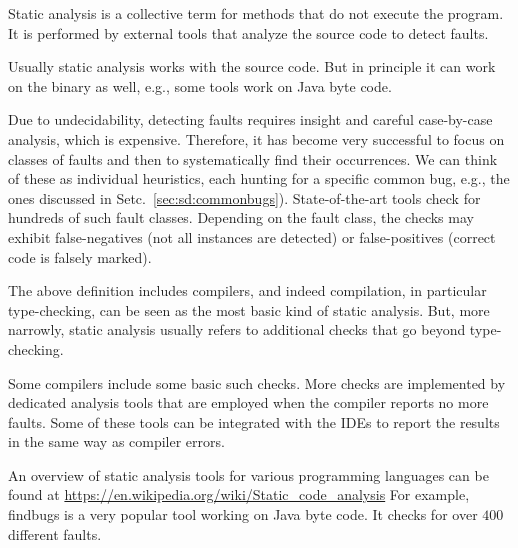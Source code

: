 Static analysis is a collective term for methods that do not execute the program.
It is performed by external tools that analyze the source code to detect faults.

Usually static analysis works with the source code.
But in principle it can work on the binary as well, e.g., some tools work on Java byte code.

Due to undecidability, detecting faults requires insight and careful case-by-case analysis, which is expensive.
Therefore, it has become very successful to focus on classes of faults and then to systematically find their occurrences.
We can think of these as individual heuristics, each hunting for a specific common bug, e.g., the ones discussed in Setc.~\ref{sec:sd:commonbugs}).
State-of-the-art tools check for hundreds of such fault classes.
Depending on the fault class, the checks may exhibit false-negatives (not all instances are detected) or false-positives (correct code is falsely marked).

The above definition includes compilers, and indeed compilation, in particular type-checking, can be seen as the most basic kind of static analysis.
But, more narrowly, static analysis usually refers to additional checks that go beyond type-checking.

Some compilers include some basic such checks.
More checks are implemented by dedicated analysis tools that are employed when the compiler reports no more faults.
Some of these tools can be integrated with the IDEs to report the results in the same way as compiler errors.

An overview of static analysis tools for various programming languages can be found at \url{https://en.wikipedia.org/wiki/Static_code_analysis}
For example, findbugs is a very popular tool working on Java byte code.
It checks for over $400$ different faults.

